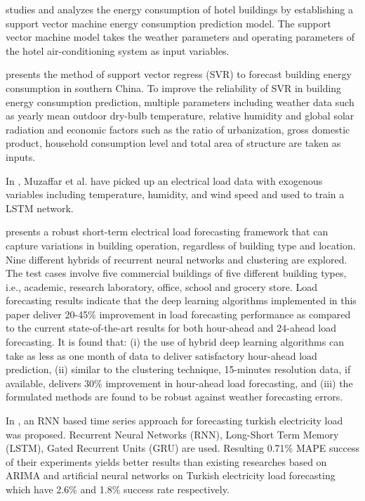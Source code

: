 \cite{SHAO2020102128} studies and analyzes the energy consumption of hotel buildings by establishing a support vector machine energy consumption prediction model.
The support vector machine model takes the weather parameters and operating parameters of the hotel air-conditioning system as input variables.

\cite{MA20193433} presents the method of support vector regress (SVR) to forecast building energy consumption in southern China.
To improve the reliability of SVR in building energy consumption prediction, multiple parameters including weather data such as yearly mean outdoor dry-bulb temperature, relative humidity and global solar radiation and economic factors such as the ratio of urbanization, gross domestic product, household consumption level and total area of structure are taken as inputs.

In \cite{MUZAFFAR20192922}, Muzaffar et al. have picked up an electrical load data with exogenous variables including temperature, humidity, and wind speed and used to train a LSTM network. 

\cite{CHITALIA2020115410}  presents a robust short-term electrical load forecasting framework that can capture variations in building operation, regardless of building type and location.
Nine different hybrids of recurrent neural networks and clustering are explored.
The test cases involve five commercial buildings of five different building types, i.e., academic, research laboratory, office, school and grocery store.
Load forecasting results indicate that the deep learning algorithms implemented in this paper deliver 20-45\% improvement in load forecasting performance as compared to the current state-of-the-art results for both hour-ahead and 24-ahead load forecasting.
It is found that:
(i) the use of hybrid deep learning algorithms can take as less as one month of data to deliver satisfactory hour-ahead load prediction,
(ii) similar to the clustering technique, 15-minutes resolution data, if available, delivers 30\% improvement in hour-ahead load forecasting,
and (iii) the formulated methods are found to be robust against weather forecasting errors.

In \cite{8404313}, an RNN based time series approach for forecasting turkish electricity load was proposed.
Recurrent Neural Networks (RNN), Long-Short Term Memory (LSTM), Gated Recurrent Units (GRU) are used.
Resulting 0.71\% MAPE success of their experiments yields better results than existing researches based on ARIMA and artificial neural networks on Turkish electricity load forecasting which have 2.6\% and 1.8\% success rate respectively.

